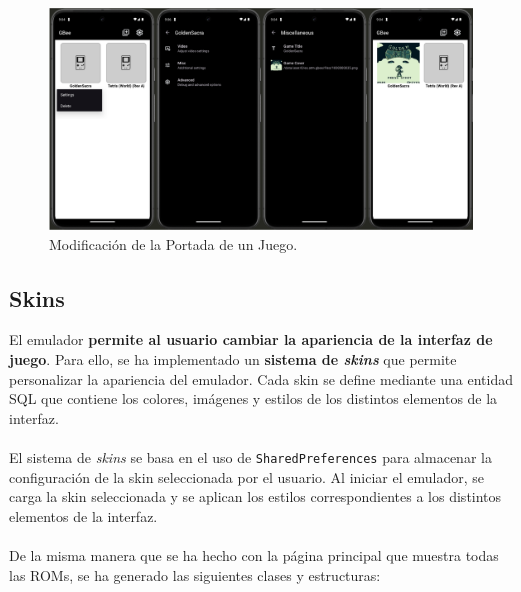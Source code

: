 \begin{figure}[H]
    \centering
    \includegraphics[width=1\textwidth]{include/images/settings_misc.png}
    \caption{Modificación de la Portada de un Juego.}\label{figure:miscFragment}
\end{figure}

\subsection{Skins}

El emulador \textbf{permite al usuario cambiar la apariencia de la interfaz de juego}. Para ello, se ha implementado un \textbf{sistema de \textit{skins}} que permite personalizar la apariencia del emulador. Cada skin se define mediante una entidad SQL que contiene los colores, imágenes y estilos de los distintos elementos de la interfaz.
\\\\
El sistema de \textit{skins} se basa en el uso de \texttt{SharedPreferences} para almacenar la configuración de la skin seleccionada por el usuario. Al iniciar el emulador, se carga la skin seleccionada y se aplican los estilos correspondientes a los distintos elementos de la interfaz.
\\\\
De la misma manera que se ha hecho con la página principal que muestra todas las ROMs, se ha generado las siguientes clases y estructuras:

